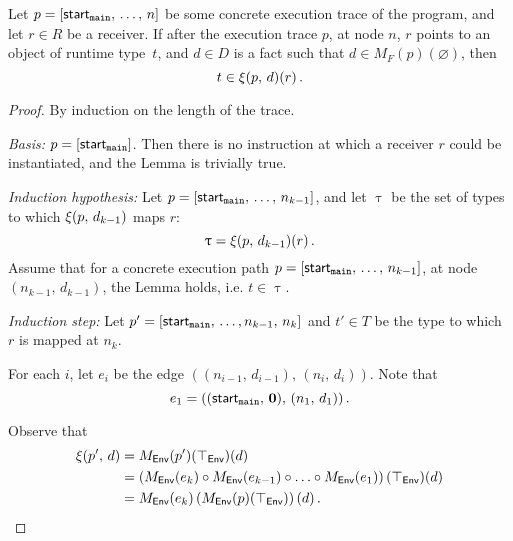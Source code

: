 \begin{lemma}\label{lem:sound1}
Let $p=[\textsf{start}_\texttt{main},\,\dots,\,n]$ be some concrete execution trace of the program, and let $r\in R$ be a receiver. If after the execution trace $p$, at node $n$, $r$ points to an object of runtime type~$t$, and $d\in D$ is a fact such that $d\in M_F(p)(\varnothing)$, then
  \begin{equation}
    t\in\xi(p,\,d)(r)\,.
  \end{equation}
\end{lemma}
\begin{proof}
  By induction on the length of the trace.
  
  \textit{Basis:} $p=[\textsf{start}_\texttt{main}]$. Then there is no instruction at which a receiver $r$ could be instantiated, and the Lemma is trivially true.    

  \textit{Induction hypothesis:} Let $p=[\textsf{start}_\texttt{main},\,\dots,\,n_{k-1}]$, and let $\uptau$ be the set of types to which $\xi(p,\,d_{k-1})$ maps $r$:
  \begin{equation}
    \uptau=\xi(p,\,d_{k-1})(r)\,.
  \end{equation}
  Assume that for a concrete execution path $p=[\textsf{start}_\texttt{main},\,\dots,\,n_{k-1}]$, at node $(n_{k-1},\,d_{k-1})$, the Lemma holds, i.e. $t\in\uptau$.
  
  \textit{Induction step:} Let $p'=[\textsf{start}_\texttt{main},\,\dots,n_{k-1},\,n_k]$ and $t'\in T$ be the type to which $r$ is mapped at $n_k$.
  
  For each $i$, let $e_i$ be the edge $((n_{i-1},\,d_{i-1}),\,(n_i,\,d_i))$. Note that $$e_1=((\textsf{start}_\texttt{main},\,\mathbf0),\,(n_1,\,d_1))\,.$$  

  Observe that
  \begin{align*}
    \xi(p',\,d)
    &=M_\textsf{Env}(p')(\top_\textsf{Env})(d)\\
    &=\left(M_\textsf{Env}(e_k)\circ M_\textsf{Env}(e_{k-1})\circ\ldots\circ M_\textsf{Env}(e_1)\right)(\top_\textsf{Env})(d)\\
    &=M_\textsf{Env}(e_k)\left(M_\textsf{Env}(p)(\top_\textsf{Env})\right)(d)\,.
  \end{align*}
  

\end{proof}
